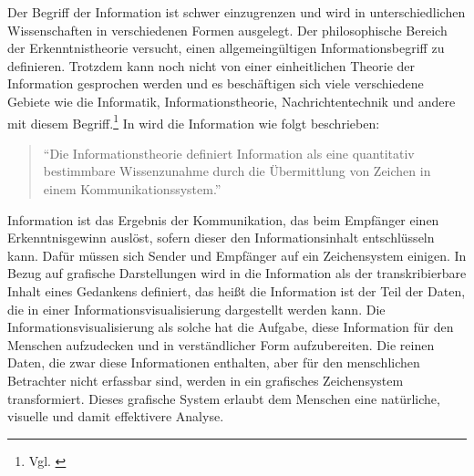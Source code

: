 \documentclass[a4paper, 12pt, DIV=calc, version=first, pdftex, headsepline, footsepline, bibtotocnumbered, liststotocnumbered]{scrreprt}
\begin{document}
Der Begriff der Information ist schwer einzugrenzen und wird in unterschiedlichen Wissenschaften
in verschiedenen Formen ausgelegt. Der philosophische Bereich der Erkenntnistheorie versucht,
einen allgemeingültigen Informationsbegriff zu definieren. Trotzdem kann noch nicht von einer
einheitlichen Theorie der Information gesprochen werden und es beschäftigen sich viele verschiedene
Gebiete wie die Informatik, Informationstheorie, Nachrichtentechnik und andere mit diesem
Begriff.\footnote{Vgl. \citep{wiki_info}} In \citep[S.\,3]{Hoeher} wird die Information wie folgt beschrieben:
\begin{quote}
"`Die Informationstheorie definiert Information als eine quantitativ bestimmbare Wissenzunahme durch
die Übermittlung von Zeichen in einem Kommunikationssystem."'
\end{quote}
Information ist das Ergebnis der Kommunikation, das beim Empfänger einen Erkenntnisgewinn auslöst,
sofern dieser den Informationsinhalt entschlüsseln kann. Dafür müssen sich Sender und Empfänger
auf ein Zeichensystem einigen.
In Bezug auf grafische Darstellungen wird in \citep{Bertin} die Information als der transkribierbare
Inhalt eines Gedankens definiert, das heißt die Information ist der Teil der Daten, die in einer
Informationsvisualisierung dargestellt werden kann. Die Informationsvisualisierung als solche hat die
Aufgabe, diese Information für den Menschen aufzudecken und in verständlicher Form aufzubereiten.
Die reinen Daten, die zwar diese Informationen enthalten,
aber für den menschlichen Betrachter nicht erfassbar sind, werden in ein grafisches
Zeichensystem transformiert. Dieses grafische System erlaubt dem Menschen eine natürliche, visuelle und
damit effektivere Analyse.
\end{document}
